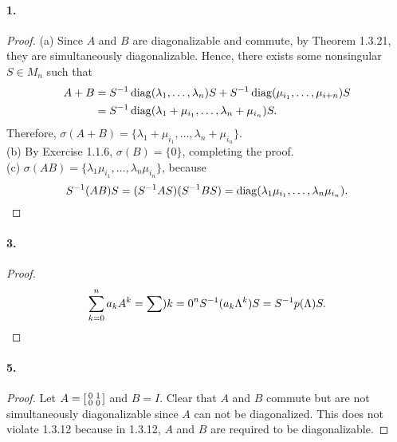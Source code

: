   \paragraph{1.}
  \begin{proof}
    (a) Since $A$ and $B$ are diagonalizable and commute, by Theorem 1.3.21, 
    they are simultaneously diagonalizable. Hence, there exists some nonsingular
    $S\in M_n$ such that
    \begin{align*}
      A+B &=
      S^{-1}\operatorname{diag}(\lambda_1,\dots,\lambda_n)S 
      + S^{-1}\operatorname{diag}(\mu_{i_1},\dots,\mu_{i+n }) S \\
      &= S^{-1}\operatorname{diag}(\lambda_1+\mu_{i_1},\dots, \lambda_n+\mu_{i_n})S.
    \end{align*}
    Therefore, $\sigma(A+B)=\{\lambda_1+\mu_{i_1},\dots, \lambda_n+\mu_{i_n}\}$.
    \\ (b) By Exercise 1.1.6, $\sigma(B)=\{0\}$, completing the proof. \\
    (c) $\sigma(AB) = \{\lambda_1\mu_{i_1},\dots,\lambda_n\mu_{i_n}\}$, because
    \[
      S^{-1}(AB)S = (S^{-1} AS)(S^{-1} BS) = 
      \operatorname{diag}(\lambda_1\mu_{i_1},\dots,\lambda_n\mu_{i_n}).
    \]
  \end{proof}

  \paragraph{3.}
  \begin{proof}
    \[
      \sum_{k=0}^n a_k A^k = \sum){k=0}^n S^{-1} (a_k\Lambda^k)S
      = S^{-1} p(\Lambda)S.
    \]
  \end{proof}

  \paragraph{5.}
  \begin{proof}
    Let $A=\begin{bsmallmatrix} 0 & 1 \\ 0 & 0\end{bsmallmatrix}$ and $B=I$.
    Clear that $A$ and $B$ commute but are not simultaneously diagonalizable 
    since $A$ can not be diagonalized. This does not violate 1.3.12 because
    in 1.3.12, $A$ and $B$ are required to be diagonalizable.
  \end{proof}

